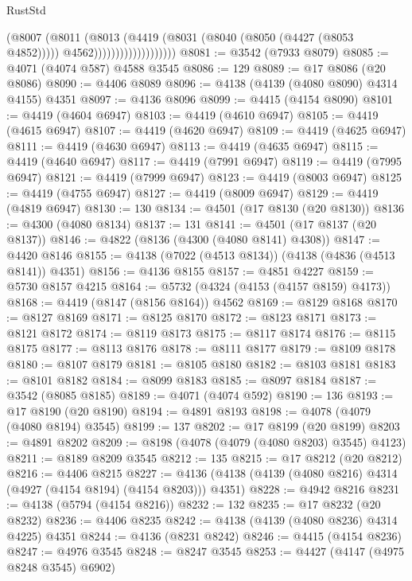 \begin{lexlean}{RustStd}
\begin{coremodule}
                                  (@8007
                                    (@8011
                                      (@8013
                                        (@4419
                                          (@8031 (@8040 (@8050 (@4427 (@8053 @4852)))))
                                          @4562)))))))))))))))))))
@8081 := @3542 (@7933 @8079)
@8085 := @4071 (@4074 @587) @4588 @3545
@8086 := 129
@8089 := @17 @8086 (@20 @8086)
@8090 := @4406 @8089
@8096 := @4138 (@4139 (@4080 @8090) @4314 @4155) @4351
@8097 := @4136 @8096
@8099 := @4415 (@4154 @8090)
@8101 := @4419 (@4604 @6947)
@8103 := @4419 (@4610 @6947)
@8105 := @4419 (@4615 @6947)
@8107 := @4419 (@4620 @6947)
@8109 := @4419 (@4625 @6947)
@8111 := @4419 (@4630 @6947)
@8113 := @4419 (@4635 @6947)
@8115 := @4419 (@4640 @6947)
@8117 := @4419 (@7991 @6947)
@8119 := @4419 (@7995 @6947)
@8121 := @4419 (@7999 @6947)
@8123 := @4419 (@8003 @6947)
@8125 := @4419 (@4755 @6947)
@8127 := @4419 (@8009 @6947)
@8129 := @4419 (@4819 @6947)
@8130 := 130
@8134 := @4501 (@17 @8130 (@20 @8130))
@8136 := @4300 (@4080 @8134)
@8137 := 131
@8141 := @4501 (@17 @8137 (@20 @8137))
@8146 := @4822 (@8136 (@4300 (@4080 @8141) @4308))
@8147 := @4420 @8146
@8155 := @4138 (@7022 (@4513 @8134)) (@4138 (@4836 (@4513 @8141)) @4351)
@8156 := @4136 @8155
@8157 := @4851 @4227
@8159 := @5730 @8157 @4215
@8164 := @5732 (@4324 (@4153 (@4157 @8159) @4173))
@8168 := @4419 (@8147 (@8156 @8164)) @4562
@8169 := @8129 @8168
@8170 := @8127 @8169
@8171 := @8125 @8170
@8172 := @8123 @8171
@8173 := @8121 @8172
@8174 := @8119 @8173
@8175 := @8117 @8174
@8176 := @8115 @8175
@8177 := @8113 @8176
@8178 := @8111 @8177
@8179 := @8109 @8178
@8180 := @8107 @8179
@8181 := @8105 @8180
@8182 := @8103 @8181
@8183 := @8101 @8182
@8184 := @8099 @8183
@8185 := @8097 @8184
@8187 := @3542 (@8085 @8185)
@8189 := @4071 (@4074 @592)
@8190 := 136
@8193 := @17 @8190 (@20 @8190)
@8194 := @4891 @8193
@8198 := @4078 (@4079 (@4080 @8194) @3545)
@8199 := 137
@8202 := @17 @8199 (@20 @8199)
@8203 := @4891 @8202
@8209 := @8198 (@4078 (@4079 (@4080 @8203) @3545) @4123)
@8211 := @8189 @8209 @3545
@8212 := 135
@8215 := @17 @8212 (@20 @8212)
@8216 := @4406 @8215
@8227 := @4136 (@4138 (@4139 (@4080 @8216) @4314 (@4927 (@4154 @8194) (@4154 @8203))) @4351)
@8228 := @4942 @8216
@8231 := @4138 (@5794 (@4154 @8216))
@8232 := 132
@8235 := @17 @8232 (@20 @8232)
@8236 := @4406 @8235
@8242 := @4138 (@4139 (@4080 @8236) @4314 @4225) @4351
@8244 := @4136 (@8231 @8242)
@8246 := @4415 (@4154 @8236)
@8247 := @4976 @3545
@8248 := @8247 @3545
@8253 := @4427 (@4147 (@4975 @8248 @3545) @6902)

\end{coremodule}
\end{lexlean}
